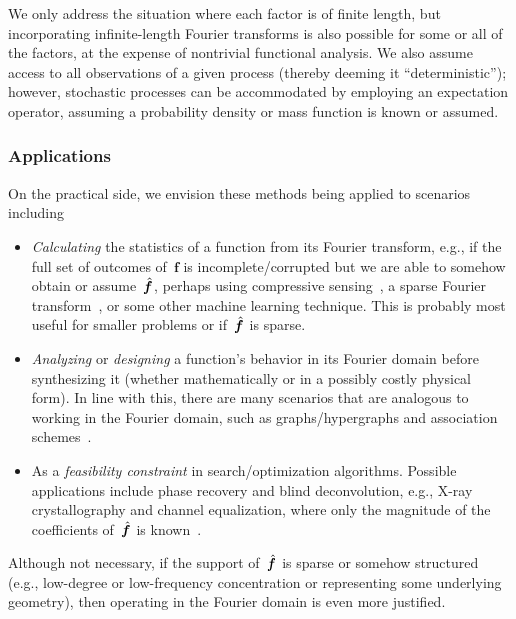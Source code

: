 \documentclass[letterpaper,11pt]{article}
\newcommand{\bs}[1]{{\boldsymbol{#1}}}
\newcommand{\hatbsf}{{\kern+0.25em}\hat{{\kern-0.25em}\bs{f}}}
\theoremstyle{definition} \newtheorem{remark}{Remark}
\begin{document}
We only address the situation where each factor is of finite length, but incorporating infinite-length Fourier transforms is also possible for some or all of the factors, at the expense of nontrivial functional analysis. We also assume access to all observations of a given process (thereby deeming it ``deterministic''); however, stochastic processes can be accommodated by employing an expectation operator, assuming a probability density or mass function is known or assumed.


\subsubsection{Applications}
On the practical side, we envision these methods being applied to scenarios including
\begin{itemize}
\item \emph{Calculating} the statistics of a function from its Fourier transform, e.g., if the full set of outcomes of~$\bs{f}$ is incomplete/corrupted but we are able to somehow obtain or assume~$\hatbsf$, perhaps using compressive sensing~\cite{CanRomTao_Noise}, a sparse Fourier transform~\cite{gross2022sparseFourierManyVariables}, or some other machine learning technique. This is probably most useful for smaller problems or if~$\hatbsf$ is sparse.

\item \emph{Analyzing} or \emph{designing} a function's behavior in its Fourier domain before synthesizing it (whether mathematically or in a possibly costly physical form). In line with this, there are many scenarios that are analogous to working in the Fourier domain, such as graphs/hypergraphs and association schemes~\cite{delsarte1973algebraic}.

\item As a \emph{feasibility constraint} in search/optimization algorithms. Possible applications include phase recovery and blind deconvolution, e.g., X-ray crystallography and channel equalization, where only the magnitude of the coefficients of~$\hatbsf$ is known~\cite{wolf2011historyXrayPhaseProblem}.
\end{itemize}
Although not necessary, if the support of~$\hatbsf$ is sparse or somehow structured (e.g., low-degree or low-frequency concentration or representing some underlying geometry), then operating in the Fourier domain is even more justified.
\end{document}
